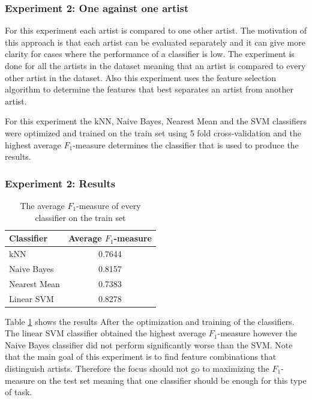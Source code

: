\subsubsection{Experiment 2: One against one artist}

For this experiment each artist is compared to one other artist.
The motivation of this approach is that each artist can be evaluated separately and it can give more clarity for cases where the performance of a classifier is low.
The experiment is done for all the artists in the dataset meaning that an artist is compared to every other artist in the dataset.
Also this experiment uses the feature selection algorithm to determine the features that best separates an artist from another artist.

For this experiment the kNN, Naive Bayes, Nearest Mean and the SVM classifiers were optimized and trained on the train set using 5 fold cross-validation and the highest average $F_1$-measure determines the classifier that is used to produce the results.

\subsubsection{Experiment 2: Results}

\begin{table}
    \centering
    \begin{tabular}
        { | l | c |} 
        \hline
        Classifier & Average $F_1$-measure  \\
        \hline
        kNN & 0.7644 \\ 
        Naive Bayes & 0.8157 \\ 
        Nearest Mean & 0.7383 \\ 
        Linear SVM & 0.8278 \\ 
        \hline 
    \end{tabular}
    \caption{The average $F_1$-measure of every classifier on the train set}
    \label{ex2optimizeresults}
\end{table}

Table \ref{ex2optimizeresults} shows the results After the optimization and training of the classifiers.
The linear SVM classifier obtained the highest average $F_1$-measure however the Naive Bayes classifier did not perform significantly worse than the SVM.
Note that the main goal of this experiment is to find feature combinations that distinguish artists.
Therefore the focus should not go to maximizing the $F_1$-measure on the test set meaning that one classifier should be enough for this type of task.

